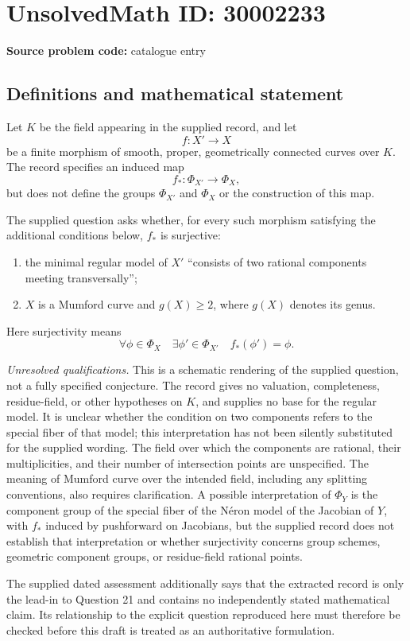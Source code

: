 \documentclass[11pt]{article}
\begin{document}
\section*{UnsolvedMath ID: 30002233}
\textbf{Source problem code:} catalogue entry
\subsection{Definitions and mathematical statement}
Let \(K\) be the field appearing in the supplied record, and let
\[
f\colon X'\longrightarrow X
\]
be a finite morphism of smooth, proper, geometrically connected curves over \(K\). The record specifies an induced map
\[
f_*\colon\Phi_{X'}\longrightarrow\Phi_X,
\]
but does not define the groups \(\Phi_{X'}\) and \(\Phi_X\) or the construction of this map.

The supplied question asks whether, for every such morphism satisfying the additional conditions below, \(f_*\) is surjective:
\begin{enumerate}
\item the minimal regular model of \(X'\) ``consists of two rational components meeting transversally'';
\item \(X\) is a Mumford curve and \(g(X)\geq 2\), where \(g(X)\) denotes its genus.
\end{enumerate}
Here surjectivity means
\[
\forall\phi\in\Phi_X\quad\exists\phi'\in\Phi_{X'}\quad f_*(\phi')=\phi.
\]

\textit{Unresolved qualifications.} This is a schematic rendering of the supplied question, not a fully specified conjecture. The record gives no valuation, completeness, residue-field, or other hypotheses on \(K\), and supplies no base for the regular model. It is unclear whether the condition on two components refers to the special fiber of that model; this interpretation has not been silently substituted for the supplied wording. The field over which the components are rational, their multiplicities, and their number of intersection points are unspecified. The meaning of Mumford curve over the intended field, including any splitting conventions, also requires clarification. A possible interpretation of \(\Phi_Y\) is the component group of the special fiber of the N\'eron model of the Jacobian of \(Y\), with \(f_*\) induced by pushforward on Jacobians, but the supplied record does not establish that interpretation or whether surjectivity concerns group schemes, geometric component groups, or residue-field rational points.

The supplied dated assessment additionally says that the extracted record is only the lead-in to Question 21 and contains no independently stated mathematical claim. Its relationship to the explicit question reproduced here must therefore be checked before this draft is treated as an authoritative formulation.
\end{document}
